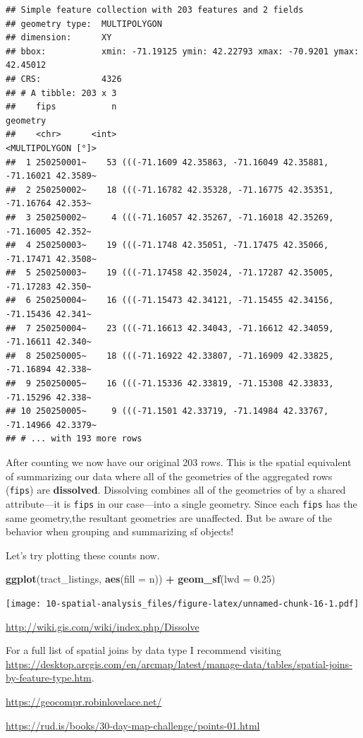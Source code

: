 \documentclass[
]{book}
\newenvironment{Shaded}{\begin{snugshade}}{\end{snugshade}}
\newcommand{\DataTypeTok}[1]{\textcolor[rgb]{0.13,0.29,0.53}{#1}}
\newcommand{\FloatTok}[1]{\textcolor[rgb]{0.00,0.00,0.81}{#1}}
\newcommand{\KeywordTok}[1]{\textcolor[rgb]{0.13,0.29,0.53}{\textbf{#1}}}
\newcommand{\NormalTok}[1]{#1}
\newcommand{\OperatorTok}[1]{\textcolor[rgb]{0.81,0.36,0.00}{\textbf{#1}}}
\newcommand{\StringTok}[1]{\textcolor[rgb]{0.31,0.60,0.02}{#1}}
\begin{document}
\begin{verbatim}
## Simple feature collection with 203 features and 2 fields
## geometry type:  MULTIPOLYGON
## dimension:      XY
## bbox:           xmin: -71.19125 ymin: 42.22793 xmax: -70.9201 ymax: 42.45012
## CRS:            4326
## # A tibble: 203 x 3
##    fips           n                                                     geometry
##    <chr>      <int>                                           <MULTIPOLYGON [°]>
##  1 250250001~    53 (((-71.1609 42.35863, -71.16049 42.35881, -71.16021 42.3589~
##  2 250250002~    18 (((-71.16782 42.35328, -71.16775 42.35351, -71.16764 42.353~
##  3 250250002~     4 (((-71.16057 42.35267, -71.16018 42.35269, -71.16005 42.352~
##  4 250250003~    19 (((-71.1748 42.35051, -71.17475 42.35066, -71.17471 42.3508~
##  5 250250003~    19 (((-71.17458 42.35024, -71.17287 42.35005, -71.17283 42.350~
##  6 250250004~    16 (((-71.15473 42.34121, -71.15455 42.34156, -71.15436 42.341~
##  7 250250004~    23 (((-71.16613 42.34043, -71.16612 42.34059, -71.16611 42.340~
##  8 250250005~    18 (((-71.16922 42.33807, -71.16909 42.33825, -71.16894 42.338~
##  9 250250005~    16 (((-71.15336 42.33819, -71.15308 42.33833, -71.15296 42.338~
## 10 250250005~     9 (((-71.1501 42.33719, -71.14984 42.33767, -71.14966 42.3379~
## # ... with 193 more rows
\end{verbatim}

After counting we now have our original 203 rows. This is the spatial equivalent of summarizing our data where all of the geometries of the aggregated rows (\texttt{fips}) are \textbf{dissolved}. Dissolving combines all of the geometries of by a shared attribute---it is \texttt{fips} in our case---into a single geometry. Since each \texttt{fips} has the same geometry,the resultant geometries are unaffected. But be aware of the behavior when grouping and summarizing sf objects!

Let's try plotting these counts now.

\begin{Shaded}
\begin{Highlighting}[]
\KeywordTok{ggplot}\NormalTok{(tract\_listings, }\KeywordTok{aes}\NormalTok{(}\DataTypeTok{fill =}\NormalTok{ n)) }\OperatorTok{+}
\StringTok{  }\KeywordTok{geom\_sf}\NormalTok{(}\DataTypeTok{lwd =} \FloatTok{0.25}\NormalTok{)}
\end{Highlighting}
\end{Shaded}

\texttt{[image: 10-spatial-analysis\_files/figure-latex/unnamed-chunk-16-1.pdf]}

\url{http://wiki.gis.com/wiki/index.php/Dissolve}

For a full list of spatial joins by data type I recommend visiting \url{https://desktop.arcgis.com/en/arcmap/latest/manage-data/tables/spatial-joins-by-feature-type.htm}.

\url{https://geocompr.robinlovelace.net/}

\url{https://rud.is/books/30-day-map-challenge/points-01.html}

  
\end{document}
